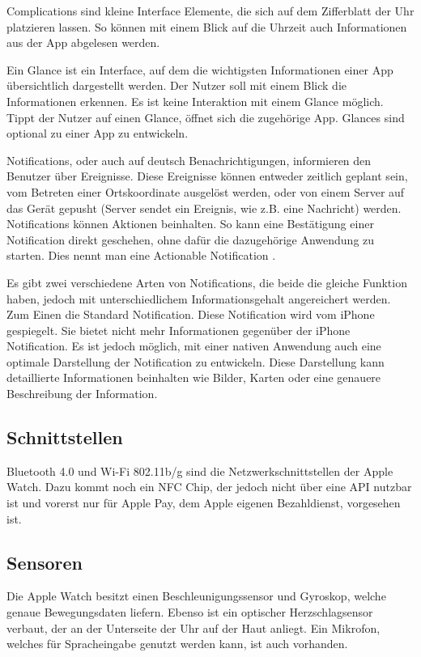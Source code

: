 Complications sind kleine Interface Elemente, die sich auf dem Zifferblatt der Uhr platzieren lassen. So können mit einem Blick auf die Uhrzeit auch Informationen aus der App abgelesen werden.

Ein Glance ist ein Interface, auf dem die wichtigsten Informationen einer App übersichtlich dargestellt werden. Der Nutzer soll mit einem Blick die Informationen erkennen. Es ist keine Interaktion mit einem Glance möglich. Tippt der Nutzer auf einen Glance, öffnet sich die zugehörige App. Glances sind optional zu einer App zu entwickeln.

Notifications, oder auch auf deutsch Benachrichtigungen, informieren den Benutzer über Ereignisse. Diese Ereignisse können entweder zeitlich geplant sein, vom Betreten einer Ortskoordinate ausgelöst werden, oder von einem Server auf das Gerät gepusht (Server sendet ein Ereignis, wie z.B. eine Nachricht) werden. Notifications können Aktionen beinhalten. So kann eine Bestätigung einer Notification direkt geschehen, ohne dafür die dazugehörige Anwendung zu starten. Dies nennt man eine Actionable Notification \cite{Apple:2015devAw}.

Es gibt zwei verschiedene Arten von Notifications, die beide die gleiche Funktion haben, jedoch mit unterschiedlichem Informationsgehalt angereichert werden. Zum Einen die Standard Notification. Diese Notification wird vom iPhone gespiegelt. Sie bietet nicht mehr Informationen gegenüber der iPhone Notification. Es ist jedoch möglich, mit einer nativen Anwendung auch eine optimale Darstellung der Notification zu entwickeln. Diese Darstellung kann detaillierte Informationen beinhalten wie Bilder, Karten oder eine genauere Beschreibung der Information\cite{Apple:2015notif}.

\subsection{Schnittstellen}
Bluetooth 4.0 und Wi-Fi 802.11b/g sind die Netzwerkschnittstellen der Apple Watch. Dazu kommt noch ein NFC Chip, der jedoch nicht über eine API nutzbar ist und vorerst nur für Apple Pay, dem Apple eigenen Bezahldienst, vorgesehen ist\cite{RITCHIE:2015aa}. 
\subsection{Sensoren}
Die Apple Watch besitzt einen Beschleunigungssensor und Gyroskop, welche genaue Bewegungsdaten liefern. Ebenso ist ein optischer Herzschlagsensor verbaut, der an der Unterseite der Uhr auf der Haut anliegt. Ein Mikrofon, welches für Spracheingabe genutzt werden kann, ist auch vorhanden.

